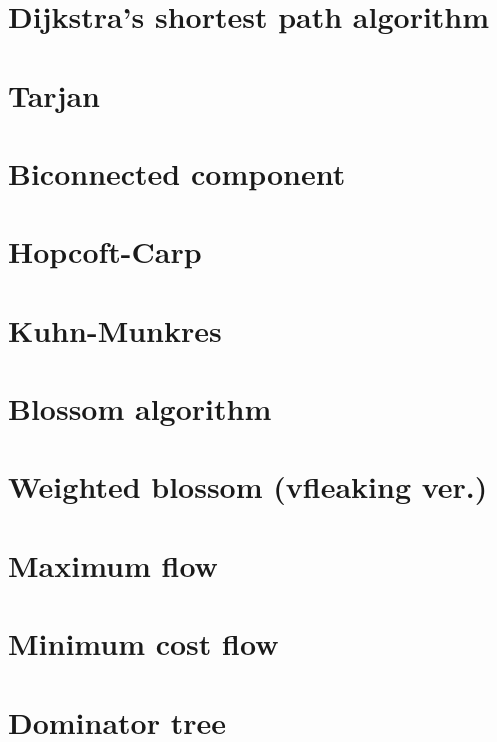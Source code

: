 \documentclass[UTF8,a4paper]{report}
\begin{document}
		\section{Dijkstra's shortest path algorithm}
			
		\section{Tarjan}
			
		\section{Biconnected component}
			
		\section{Hopcoft-Carp}
			
		\section{Kuhn-Munkres}
			
		\section{Blossom algorithm}
			
		\section{Weighted blossom (vfleaking ver.)}	
			
		\section{Maximum flow}
			
		\section{Minimum cost flow}
			
		\section{Dominator tree}
			
\end{document}
